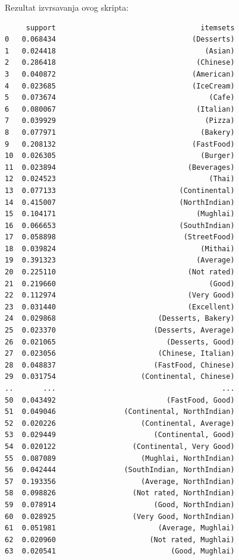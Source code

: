 \documentclass[11pt]{article} %
\begin{document}
Rezultat izvrsavanja ovog skripta:
\begin{lstlisting}
     support                                  itemsets
0   0.068434                                (Desserts)
1   0.024418                                   (Asian)
2   0.286418                                 (Chinese)
3   0.040872                                (American)
4   0.023685                                (IceCream)
5   0.073674                                    (Cafe)
6   0.080067                                 (Italian)
7   0.039929                                   (Pizza)
8   0.077971                                  (Bakery)
9   0.208132                                (FastFood)
10  0.026305                                  (Burger)
11  0.023894                               (Beverages)
12  0.024523                                    (Thai)
13  0.077133                             (Continental)
14  0.415007                             (NorthIndian)
15  0.104171                                 (Mughlai)
16  0.066653                             (SouthIndian)
17  0.058898                              (StreetFood)
18  0.039824                                  (Mithai)
19  0.391323                                 (Average)
20  0.225110                               (Not rated)
21  0.219660                                    (Good)
22  0.112974                               (Very Good)
23  0.031440                               (Excellent)
24  0.029868                        (Desserts, Bakery)
25  0.023370                       (Desserts, Average)
26  0.021065                          (Desserts, Good)
27  0.023056                        (Chinese, Italian)
28  0.048837                       (FastFood, Chinese)
29  0.031754                    (Continental, Chinese)
..       ...                                       ...
50  0.043492                          (FastFood, Good)
51  0.049046                (Continental, NorthIndian)
52  0.020226                    (Continental, Average)
53  0.029449                       (Continental, Good)
54  0.020122                  (Continental, Very Good)
55  0.087089                    (Mughlai, NorthIndian)
56  0.042444                (SouthIndian, NorthIndian)
57  0.193356                    (Average, NorthIndian)
58  0.098826                  (Not rated, NorthIndian)
59  0.078914                       (Good, NorthIndian)
60  0.028925                  (Very Good, NorthIndian)
61  0.051981                        (Average, Mughlai)
62  0.020960                      (Not rated, Mughlai)
63  0.020541                           (Good, Mughlai)

\end{lstlisting}
\end{document}
